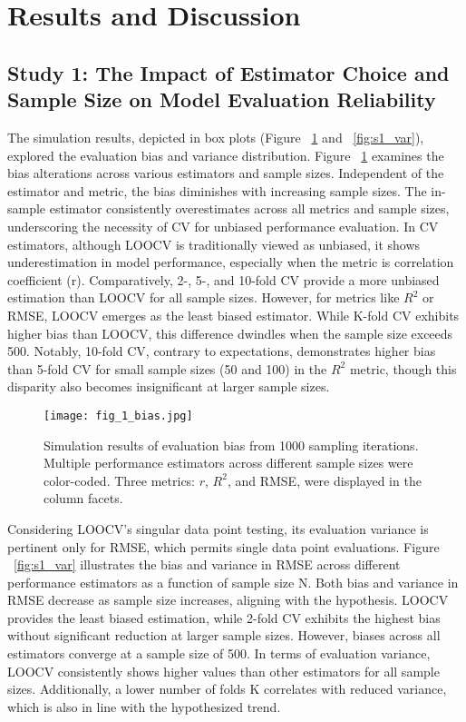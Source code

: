 \section{Results and Discussion}

\subsection{Study 1: The Impact of Estimator Choice and Sample Size on Model Evaluation Reliability}

The simulation results, depicted in box plots (Figure ~\ref{fig:s1_bias} and ~\ref{fig:s1_var}), explored the evaluation bias and variance distribution. Figure ~\ref{fig:s1_bias} examines the bias alterations across various estimators and sample sizes. Independent of the estimator and metric, the bias diminishes with increasing sample sizes. The in-sample estimator consistently overestimates across all metrics and sample sizes, underscoring the necessity of CV for unbiased performance evaluation. In CV estimators, although LOOCV is traditionally viewed as unbiased, it shows underestimation in model performance, especially when the metric is correlation coefficient (r). Comparatively, 2-, 5-, and 10-fold CV provide a more unbiased estimation than LOOCV for all sample sizes. However, for metrics like $R^2$ or RMSE, LOOCV emerges as the least biased estimator. While K-fold CV exhibits higher bias than LOOCV, this difference dwindles when the sample size exceeds 500. Notably, 10-fold CV, contrary to expectations, demonstrates higher bias than 5-fold CV for small sample sizes (50 and 100) in the $R^2$ metric, though this disparity also becomes insignificant at larger sample sizes.

\begin{figure}[h]
    \centering
    \texttt{[image: fig\_1\_bias.jpg]}
    \caption{Simulation results of evaluation bias from 1000 sampling iterations. Multiple performance estimators across different sample sizes were color-coded. Three metrics: $r$, $R^2$, and RMSE, were displayed in the column facets.}
    \label{fig:s1_bias}
\end{figure}

Considering LOOCV’s singular data point testing, its evaluation variance is pertinent only for RMSE, which permits single data point evaluations. Figure ~\ref{fig:s1_var} illustrates the bias and variance in RMSE across different performance estimators as a function of sample size N. Both bias and variance in RMSE decrease as sample size increases, aligning with the hypothesis. LOOCV provides the least biased estimation, while 2-fold CV exhibits the highest bias without significant reduction at larger sample sizes. However, biases across all estimators converge at a sample size of 500. In terms of evaluation variance, LOOCV consistently shows higher values than other estimators for all sample sizes. Additionally, a lower number of folds K correlates with reduced variance, which is also in line with the hypothesized trend.

